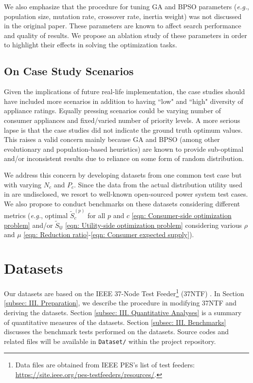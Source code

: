 \documentclass[journal, a4paper]{IEEEtran}
\begin{document}
We also emphasize that the procedure for tuning GA and BPSO parameters
(\textit{e.g.}, population size, mutation rate, crossover rate, inertia weight)
was not discussed in the original paper.
These parameters are known to affect search performance and quality of results.
We propose an ablation study of these parameters in order to highlight their effects in solving the optimization tasks.

\subsection{On Case Study Scenarios}
\label{subsec: II. On Case Study Scenarios}

Given the implications of future real-life implementation,
the case studies should have included more scenarios
in addition to having ``low" and ``high" diversity of appliance ratings.
Equally pressing scenarios could be varying number of consumer appliances and fixed/varied number of priority levels.
A more serious lapse is that the case studies did not indicate the ground truth optimum values.
This raises a valid concern mainly because GA and BPSO
(among other evolutionary and population-based heuristics)
are known to provide sub-optimal and/or inconsistent results due to reliance on some form of random distribution.

We address this concern by developing datasets from one common test case but with varying $N_c$ and $P_c$.
Since the data from the actual distribution utility used in \cite{Jabian2020} are undisclosed,
we resort to well-known open-sourced power system test cases.
We also propose to conduct benchmarks on these datasets considering different metrics
(\textit{e.g.}, optimal $\tilde{S}_{c}^{\left(p\right)}$ for all $p$ and $c$ \eqref{eqn: Consumer-side optimization problem}
and/or $\tilde{S}_{\mathsf{U}}$ \eqref{eqn: Utility-side optimization problem}
considering various $\rho$ and $\mu$ \eqref{eqn: Reduction ratio}-\eqref{eqn: Consumer expected supply}).

\section{Datasets}
\label{sec: Datasets}

Our datasets are based on the IEEE 37-Node Test Feeder\footnote{
	Data files are obtained from IEEE PES's list of test feeders:
	\url{https://site.ieee.org/pes-testfeeders/resources/}.
}
(37NTF) \cite{Kersting2001}.
In Section \ref{subsec: III. Preparation}, we describe the procedure in modifying 37NTF and deriving the datasets.
Section \ref{subsec: III. Quantitative Analyses} is a summary of quantitative measures of the datasets.
Section \ref{subsec: III. Benchmarks} discusses the benchmark tests performed on the datasets.
Source codes and related files will be available in \texttt{Dataset/} within the project repository.
\end{document}
